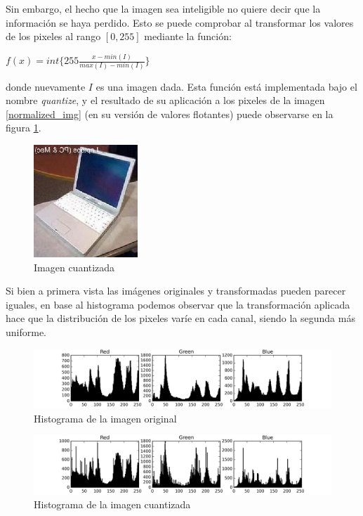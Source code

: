 \documentclass[11pt,spanish]{article}
\begin{document}
Sin embargo, el hecho que la imagen sea inteligible no quiere decir que la información se haya perdido. Esto se puede comprobar al transformar los valores de los pixeles al rango $[0,255]$ mediante la función:
\ \
\begin{center}
	\begin{math}
		f(x) = int\lbrace 255 \frac{x-min(I)}{max(I)-min(I)} \rbrace
	\end{math}
\end{center}
donde nuevamente $I$ es una imagen dada. Esta función está implementada bajo el nombre \textit{quantize}, y el resultado de su aplicación a los pixeles de la imagen \ref{normalized_img} (en su versión de valores flotantes) puede observarse en la figura \ref{quantized_img}.

\begin{figure}[htbp]
	\centering
	\includegraphics[width=0.35\textwidth]{../quantized_image.jpg}
	\caption{Imagen cuantizada}
	\label{quantized_img}
\end{figure}

Si bien a primera vista las imágenes originales y transformadas pueden parecer iguales, en base al histograma podemos observar que la transformación aplicada hace que la distribución de los pixeles varíe en cada canal, siendo la segunda más uniforme.

\begin{figure}[htbp]
	\centering
	\includegraphics[width=1\textwidth]{../image_histogram.jpg}
	\caption{Histograma de la imagen original}
	\label{hist_original_img}
\end{figure}

\begin{figure}[htbp]
	\centering
	\includegraphics[width=1\textwidth]{../quantized_image_histogram.jpg}
	\caption{Histograma de la imagen cuantizada}
	\label{hist_quantized_img}
\end{figure}
\end{document}
